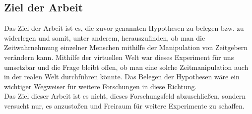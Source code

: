 \documentclass{Paper}
\begin{document}
\subsection{Ziel der Arbeit}
Das Ziel der Arbeit ist es, die zuvor genannten Hypothesen zu belegen bzw. zu widerlegen und somit, unter anderem, herauszufinden, ob man die Zeitwahrnehmung einzelner Menschen mithilfe der Manipulation von Zeitgebern verändern kann. Mithilfe der virtuellen Welt war dieses Experiment für uns umsetzbar und die Frage bleibt offen, ob man eine solche Zeitmanipulation auch in der realen Welt durchführen könnte. Das Belegen der Hypothesen wäre ein wichtiger Wegweiser für weitere Forschungen in diese Richtung.\\
Das Ziel dieser Arbeit ist es nicht, dieses Forschungsfeld abzuschließen, sondern versucht nur, es anzustoßen und Freiraum für weitere Experimente zu schaffen.
\end{document}
